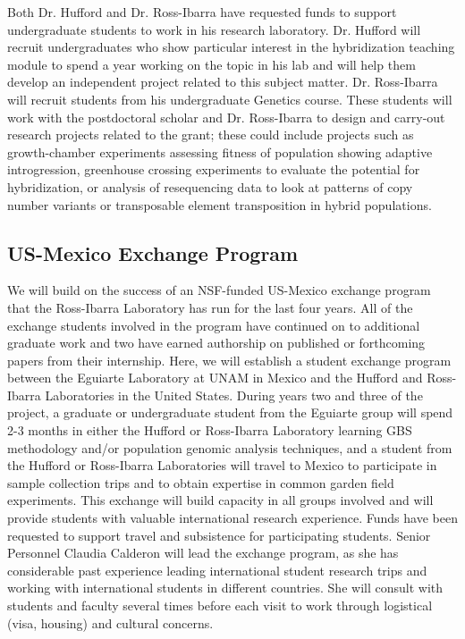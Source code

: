 Both Dr. Hufford and Dr. Ross-Ibarra have requested funds to support undergraduate students to work in his research laboratory.
Dr. Hufford will recruit undergraduates who show particular interest in the hybridization teaching module to spend a year working on the topic in his lab and will help them develop an independent project related to this subject matter.
Dr. Ross-Ibarra will recruit students from his undergraduate Genetics course.  These students will work with the postdoctoral scholar and Dr. Ross-Ibarra to design and carry-out research projects related to the grant; these could include projects such as growth-chamber experiments assessing fitness of population showing adaptive introgression, greenhouse crossing experiments to evaluate the potential for hybridization, or analysis of resequencing data to look at patterns of copy number variants or transposable element transposition in hybrid populations.

\subsection*{US-Mexico Exchange Program}
We will build on the success of an NSF-funded US-Mexico exchange program that the Ross-Ibarra Laboratory has run for the last four years.  
All of the exchange students involved in the program have continued on to additional graduate work and two have earned authorship on published or forthcoming papers from their internship.  
Here, we will establish a student exchange program between the Eguiarte Laboratory at UNAM in Mexico and the Hufford and Ross-Ibarra Laboratories in the United States.
During years two and three of the project, a graduate or undergraduate student from the Eguiarte group will spend 2-3 months in either the Hufford or Ross-Ibarra Laboratory learning GBS methodology and/or population genomic analysis techniques, and a student from the Hufford or Ross-Ibarra Laboratories will travel to Mexico to participate in sample collection trips and to obtain expertise in common garden field experiments. 
This exchange will build capacity in all groups involved and will provide students with valuable international research experience. 
Funds have been requested to support travel and subsistence for participating students. 
Senior Personnel Claudia Calderon will lead the exchange program, as she has considerable past experience leading international student research trips and working with international students in different countries.
She will consult with students and faculty several times before each visit to work through logistical (visa, housing) and cultural concerns.


